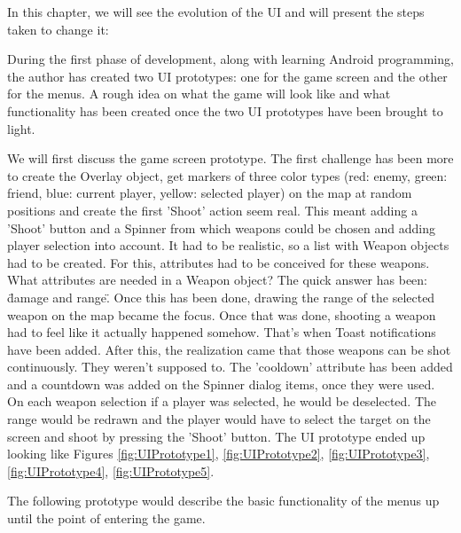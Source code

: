 \documentclass{article}
\begin{document}
In this chapter, we will see the evolution of the UI and will present the steps
taken to change it:\newline

During the first phase of development, along with learning Android programming,
the author has created two UI prototypes: one for the game screen and the other
for the menus. A rough idea on what the game will look like and what
functionality has been created once the two UI prototypes have been brought to
light.\newline

We will first discuss the game screen prototype. The first challenge has been
more to create the Overlay object, get markers of three color types (red: enemy,
green: friend, blue: current player, yellow: selected player) on the map at
random positions and create the first 'Shoot' action seem real. This meant
adding a 'Shoot' button and a Spinner from which weapons could be chosen and
adding player selection into account. It had to be realistic, so a list with
Weapon objects had to be created. For this, attributes had to be conceived for
these weapons. What attributes are needed in a Weapon object? The quick answer
has been: \"damage and range\". Once this has been done, drawing the range of
the selected weapon on the map became the focus. Once that was done, shooting a
weapon had to feel like it actually happened somehow. That's when Toast
notifications have been added. After this, the realization came that those
weapons can be shot continuously. They weren't supposed to. The 'cooldown'
attribute has been added and a countdown was added on the Spinner dialog items,
once they were used. On each weapon selection if a player was selected, he would
be deselected. The range would be redrawn and the player would have to select
the target on the screen and shoot by pressing the 'Shoot' button. The UI
prototype ended up looking like Figures \ref{fig:UIPrototype1},
\ref{fig:UIPrototype2}, \ref{fig:UIPrototype3}, \ref{fig:UIPrototype4},
\ref{fig:UIPrototype5}.\newline

The following prototype would describe the basic functionality of the menus up
until the point of entering the game.\newline
\end{document}
